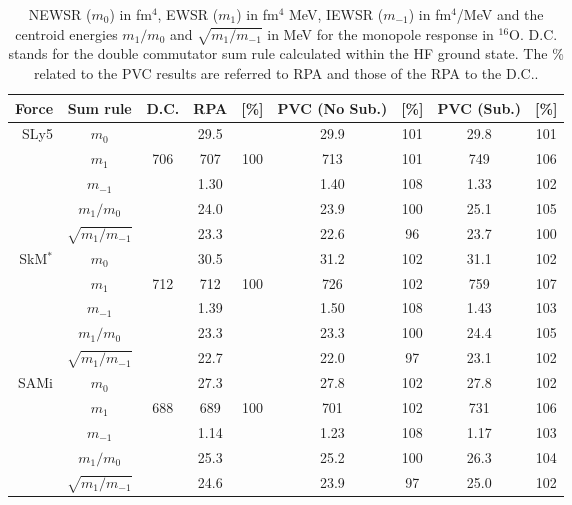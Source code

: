 \documentclass[12pt,a4paper,final]{iopart}
\begin{document}
\begin{table}[t!]
\caption{\label{tab1} NEWSR ($m_0$) in fm$^4$, EWSR ($m_1$) in fm$^4$ MeV, IEWSR ($m_{-1}$) in fm$^4$/MeV and the centroid energies $m_1/m_0$ and $\sqrt{m_1/m_{-1}}$ in MeV for the monopole response in ${}^{16}$O. D.C. stands for the double commutator sum rule  calculated within the HF ground state. The \% related to the PVC results are referred to RPA and those of the RPA to the D.C..} 
\begin{center}
\begin{tabular}{rcccccccc}
 \hline\hline
Force &Sum rule& D.C. & RPA & [\%] & PVC (No Sub.) & [\%]& PVC (Sub.) & [\%]\\
 \hline
SLy5   &$m_{ 0}$&    &29.5& &29.9& 101&29.8& 101\\
       &$m_{ 1}$& 706&707 & 100& 713 & 101& 749  & 106\\
       &$m_{-1}$&    &1.30&    & 1.40& 108& 1.33 & 102\\
       &$m_{ 1}/m_0$&    &24.0& &23.9&100 &25.1& 105\\
       &$\sqrt{m_1/m_{-1}}$& &23.3& &22.6&96&23.7&100\\
 \hline
SkM$^*$&$m_{ 0}$&    &30.5& &31.2& 102&31.1& 102\\
       &$m_{ 1}$& 712&712 & 100& 726 & 102& 759  & 107\\
       &$m_{-1}$&    &1.39&    & 1.50& 108& 1.43 & 103\\
       &$m_{ 1}/m_0$&    &23.3& &23.3&100 &24.4& 105\\
       &$\sqrt{m_1/m_{-1}}$& &22.7& & 22.0&97 & 23.1&102 \\
 \hline
SAMi   &$m_{ 0}$&    &27.3& &27.8& 102&27.8& 102\\
       &$m_{ 1}$& 688&689 & 100& 701 & 102& 731  & 106\\ 
       &$m_{-1}$&    &1.14&    & 1.23& 108& 1.17 & 103\\
       &$m_{ 1}/m_0$&    &25.3& &25.2&100 &26.3& 104\\
       &$\sqrt{m_1/m_{-1}}$& &24.6& & 23.9&97 & 25.0& 102\\
 \hline\hline
\end{tabular}
\end{center}
\end{table}
\end{document}
